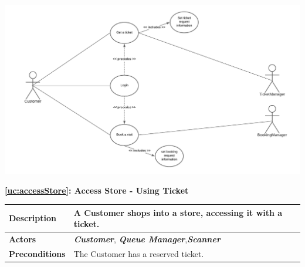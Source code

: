 \documentclass[a4paper, 12pt, oneside]{article}
\begin{document}
\begin{enumerate}[labelindent=20pt, label={UC.\arabic*}, itemindent=1em,leftmargin=!]
\begin{minipage}{\linewidth}
        \centering
           \includegraphics[height=0.33\textheight, scale=0.1, keepaspectratio]{img/book_ticket_use_diagram.png}
        \end{minipage}

\begin{center}
{\textbf{\ref{uc:accessStore}: Access Store - Using Ticket}}
\end{center}
\begin{tabularx}{\linewidth}{| l | X |}
    
    \hline
    \textbf{Description} & A Customer shops into a store, accessing it with a ticket.\\
    

    \hline
    \textbf{Actors} & \textbf{\textit{Customer}}, \textit{\textbf{Queue Manager}},\textit{\textbf{Scanner}} \\
    
    \hline
    \textbf{Preconditions} & The Customer has a reserved ticket.\\
    

\end{tabularx}
\end{enumerate}
\end{document}
